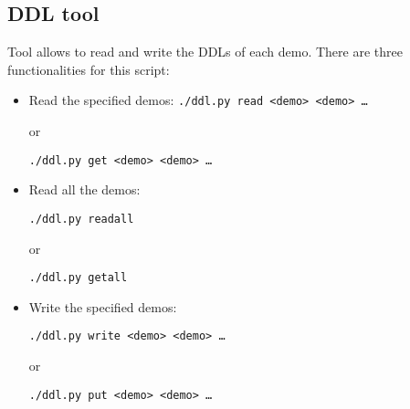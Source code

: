 \subsection{DDL tool}
\label{sec:ddl_tool}
Tool allows to read and write the DDLs of each demo. There are three functionalities for this script:
\begin{itemize}

\item Read the specified demos:
\texttt{./ddl.py read <demo> <demo> \dots}

or

\texttt{./ddl.py get <demo> <demo> \dots}

\item Read all the demos:

\texttt{./ddl.py readall}

or

\texttt{./ddl.py getall}

\item Write the specified demos:

\texttt{./ddl.py write <demo> <demo> \dots}

or

\texttt{./ddl.py put <demo> <demo> \dots}

\end{itemize}
